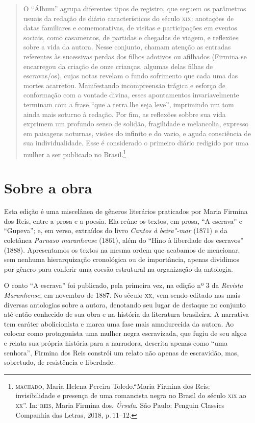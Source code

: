 \begin{quote}
O ``Álbum'' agrupa diferentes tipos de registro, que seguem os parâmetros usuais da redação de diário característicos do século \textsc{xix}: anotações de datas familiares e comemorativas, de visitas e participações em eventos sociais, como casamentos, de partidas e chegadas de viagem, e reflexões sobre a vida da autora.
Nesse conjunto, chamam atenção as entradas referentes às sucessivas perdas dos filhos adotivos ou afilhados (Firmina se encarregou da criação de onze crianças, algumas delas filhas de escravas/os), cujas notas revelam o fundo sofrimento que cada uma das mortes acarretou.
Manifestando incompreensão trágica e esforço de conformação com a vontade divina, esses apontamentos invariavelmente terminam com a frase ``que a terra lhe seja leve'', imprimindo um tom ainda mais soturno à redação. Por fim, as reflexões sobbre sua vida exprimem um profundo senso de solidão, fragilidade e melancolia, expresso em paisagens noturnas, visões do infinito e do vazio, e aguda consciência de sua individualidade. Esse é considerado o primeiro diário redigido por uma mulher a ser publicado no Brasil.\footnote{\textsc{machado}, Maria Helena Pereira Toledo.``Maria Firmina dos Reis: invisibilidade e presença de uma romancista negra no Brasil do século \textsc{xix} ao \textsc{xx}''. In: \textsc{reis}, Maria Firmina dos. \textit{Úrsula}. São Paulo: Penguin Classics Companhia das Letras, 2018, p.\,11--12.}
\end{quote}

\section{Sobre a obra}

Esta edição é uma miscelânea de gêneros literários praticados por Maria
Firmina dos
Reis, entre a prosa e a poesia. Ela reúne os textos, em prosa, ``A
escrava'' e ``Gupeva''; e, em verso, extraídos do livro \emph{Cantos à
beira"-mar} (1871) e da coletânea \emph{Parnaso maranhense} (1861), além
do ``Hino à liberdade dos escravos'' (1888). Apresentamos os textos na
mesma ordem que acabamos de mencionar, sem nenhuma hierarquização
cronológica ou de importância, apenas dividimos por gênero para conferir
uma coesão estrutural na organização da antologia.

O conto ``A escrava'' foi publicado, pela primeira vez, na edição nº 3
da \emph{Revista Maranhense}, em novembro de 1887. No século \textsc{xx}, vem
sendo editado nas mais diversas antologias sobre a autora, denotando seu
lugar de destaque no conjunto até então conhecido de sua obra e na
história da literatura brasileira. A narrativa tem caráter abolicionista
e marca uma fase mais amadurecida da autora. Ao colocar como
protagonista uma mulher negra escravizada, que fugiu de seu algoz e
relata sua própria história para a narradora, descrita apenas como ``uma
senhora'', Firmina dos Reis constrói um relato não apenas de escravidão,
mas, sobretudo, de resistência e liberdade.

